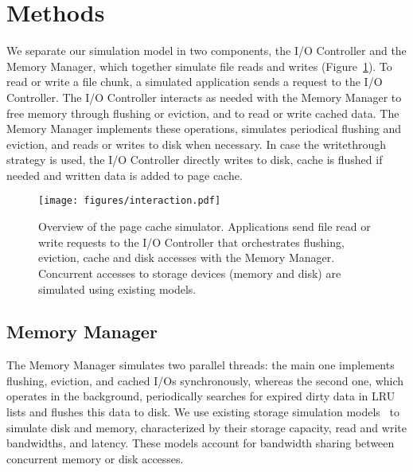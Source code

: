 \documentclass[conference]{IEEEtran}
\begin{document}
    \section{Methods}
    \label{method}

    We separate our simulation model in two components, the I/O
    Controller and the Memory Manager, which together simulate
    file reads and writes (Figure~\ref{fig:interaction}).
    To read or write a file chunk, a simulated application sends a
    request to the I/O Controller. The I/O Controller interacts as needed with
    the Memory Manager to free memory through flushing or eviction,
    and to read or write cached data. The Memory Manager
    implements these operations, simulates periodical flushing
    and eviction, and reads or writes to disk when necessary.
    In case the writethrough strategy is used, the I/O Controller directly writes to disk, 
    cache is flushed if needed and written data is added to page cache.

    \begin{figure}
           \centering
           \texttt{[image: figures/interaction.pdf]}
           \caption{Overview of the page cache simulator.
           Applications send file read or write requests to the
           I/O Controller that orchestrates flushing, eviction, cache
           and disk accesses with the Memory Manager. Concurrent accesses to storage
           devices (memory and disk) are simulated using existing models.}
           \label{fig:interaction}
    \end{figure}

    \subsection{Memory Manager}

    The Memory Manager simulates two parallel threads: the main one
    implements flushing, eviction, and cached I/Os synchronously, whereas
    the second one, which operates in the background, periodically searches for
    expired dirty data in LRU lists and flushes this data to disk. We
    use existing storage simulation models~\cite{lebre2015} to simulate disk and
    memory, characterized by their storage capacity, read and write
    bandwidths, and latency. These models account for
    bandwidth sharing between concurrent memory or disk accesses.
\end{document}
